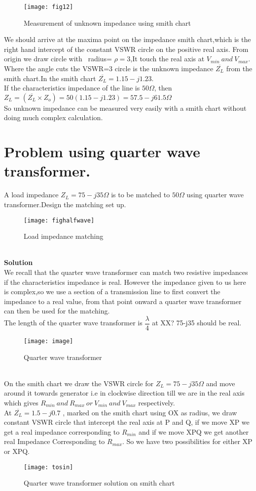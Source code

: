  \begin{figure}[h]
 	\centering
 	\texttt{[image: fig12]}
 	\caption{Measurement of unknown impedance using smith chart}
 \end{figure}
 We should arrive at the maxima point on the impedance smith chart,which is the right hand intercept of the constant VSWR circle on the positive real axis. From origin we draw circle with \ radius= $\rho =3$,It touch the real axis at $V_{min}\ and\ V_{max}$. Where the angle cuts the VSWR=3 circle is the unknown impedance $\overline{Z_{L}}$ from the smith chart.In the smith chart $\overline{Z_{L}}=1.15-j1.23$. \\
If the characteristics impedance of the line is $50\Omega$, then \\
$Z_{L}= (\overline{Z_{L}}\times Z_o)=50(1.15-j1.23)= 57.5-j61.5 \Omega$ \\
So unknown impedance can be measured very easily with a smith chart without doing much complex calculation.

\section{Problem using quarter wave transformer.}
 A load impedance $Z_{L}=75-j35\Omega$ is to be matched to $50\Omega$ using quarter wave transformer.Design the matching set up. 
 \begin{figure}[h]
	\centering
	\texttt{[image: fighalfwave]}
	\caption{Load impedance matching}
\end{figure}\\
\textbf{Solution}\\
We recall that the quarter wave transformer can match two resistive impedances if the characteristics impedance is real. However the impedance given to us here is complex,so we use a section of a transmission line to first convert the impedance to a real value, from that point onward a quarter wave transformer can then be used for the matching.\\
The length of the quarter wave  transformer is $\dfrac{\lambda}{4}$ at XX? 75-j35 should be real.
 \begin{figure}[h]
	\centering
	\texttt{[image: image]}
	\caption{Quarter wave transformer}
\end{figure}\\
On the smith chart we draw the VSWR circle for $Z_{L} =75-j35\Omega$ and move around it towards generator i.e in clockwise direction till we are in the real axis which gives $R_{min}\ and\ R_{max}\ or\ V_{min}\ and\ V_{max}$ respectively. \\
At  $ \overline{Z_{L}}=1.5-j0.7$ , marked on the smith chart using OX as radius, we draw constant VSWR circle that intercept the real axis at P and Q, if we move XP we get a real impedance corresponding to $R_{min}$ and if we move XPQ we get another real Impedance Corresponding to $R_{max}$. So we have two possibilities for either XP or XPQ.\\
\begin{figure}[h]
	\centering
	\texttt{[image: tosin]}
	\caption{Quarter wave transformer solution on smith chart}
\end{figure}

